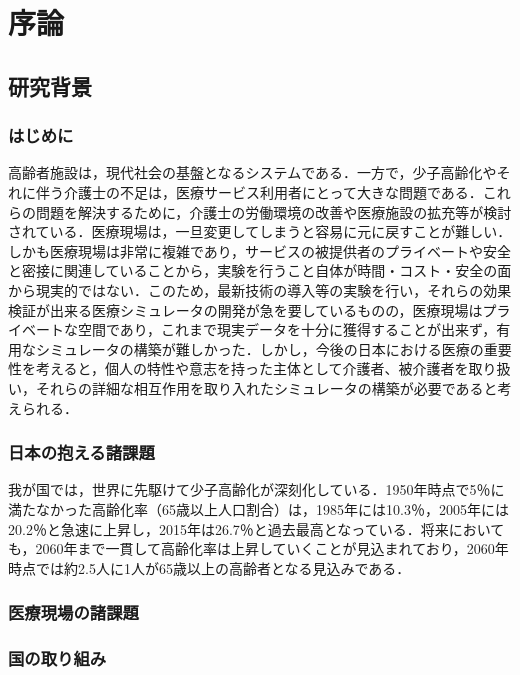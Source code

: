 \chapter{序論}

\section{研究背景}

\subsection{はじめに}
高齢者施設は，現代社会の基盤となるシステムである．一方で，少子高齢化やそれに伴う介護士の不足は，医療サービス利用者にとって大きな問題である．これらの問題を解決するために，介護士の労働環境の改善や医療施設の拡充等が検討されている．医療現場は，一旦変更してしまうと容易に元に戻すことが難しい．しかも医療現場は非常に複雑であり，サービスの被提供者のプライベートや安全と密接に関連していることから，実験を行うこと自体が時間・コスト・安全の面から現実的ではない．このため，最新技術の導入等の実験を行い，それらの効果検証が出来る医療シミュレータの開発が急を要しているものの，医療現場はプライベートな空間であり，これまで現実データを十分に獲得することが出来ず，有用なシミュレータの構築が難しかった．しかし，今後の日本における医療の重要性を考えると，個人の特性や意志を持った主体として介護者、被介護者を取り扱い，それらの詳細な相互作用を取り入れたシミュレータの構築が必要であると考えられる．

\subsection{日本の抱える諸課題}

我が国では，世界に先駆けて少子高齢化が深刻化している．1950年時点で5％に満たなかった高齢化率（65歳以上人口割合）は，1985年には10.3％，2005年には20.2％と急速に上昇し，2015年は26.7％と過去最高となっている．将来においても，2060年まで一貫して高齢化率は上昇していくことが見込まれており，2060年時点では約2.5人に1人が65歳以上の高齢者となる見込みである\cite{ex_kousei_v1}．

\subsection{医療現場の諸課題}

\subsection{国の取り組み}

